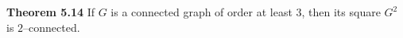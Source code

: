 \nopagenumbers
{\bf Theorem 5.14}
\vskip 6pt
If $G$ is a connected graph of order at least $3$, then its square $G^2$ is $2$--connected.

\vfill\eject
